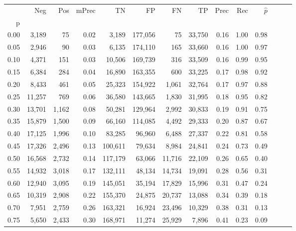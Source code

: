\begin{tabular}{rrrrrrrrrrrrrr}
\toprule
{} &     Neg &    Pos & mPrec &       TN &       FP &      FN &      TP &  Prec &   Rec & $\hat{p}$ \\
p    &         &        &       &          &          &         &         &       &       &           \\
\midrule
0.00 &   3,189 &     75 &  0.02 &    3,189 &  177,056 &      75 &  33,750 &  0.16 &  1.00 &      0.98 \\
0.05 &   2,946 &     90 &  0.03 &    6,135 &  174,110 &     165 &  33,660 &  0.16 &  1.00 &      0.97 \\
0.10 &   4,371 &    151 &  0.03 &   10,506 &  169,739 &     316 &  33,509 &  0.16 &  0.99 &      0.95 \\
0.15 &   6,384 &    284 &  0.04 &   16,890 &  163,355 &     600 &  33,225 &  0.17 &  0.98 &      0.92 \\
0.20 &   8,433 &    461 &  0.05 &   25,323 &  154,922 &   1,061 &  32,764 &  0.17 &  0.97 &      0.88 \\
0.25 &  11,257 &    769 &  0.06 &   36,580 &  143,665 &   1,830 &  31,995 &  0.18 &  0.95 &      0.82 \\
0.30 &  13,701 &  1,162 &  0.08 &   50,281 &  129,964 &   2,992 &  30,833 &  0.19 &  0.91 &      0.75 \\
0.35 &  15,879 &  1,500 &  0.09 &   66,160 &  114,085 &   4,492 &  29,333 &  0.20 &  0.87 &      0.67 \\
0.40 &  17,125 &  1,996 &  0.10 &   83,285 &   96,960 &   6,488 &  27,337 &  0.22 &  0.81 &      0.58 \\
0.45 &  17,326 &  2,496 &  0.13 &  100,611 &   79,634 &   8,984 &  24,841 &  0.24 &  0.73 &      0.49 \\
0.50 &  16,568 &  2,732 &  0.14 &  117,179 &   63,066 &  11,716 &  22,109 &  0.26 &  0.65 &      0.40 \\
0.55 &  14,932 &  3,018 &  0.17 &  132,111 &   48,134 &  14,734 &  19,091 &  0.28 &  0.56 &      0.31 \\
0.60 &  12,940 &  3,095 &  0.19 &  145,051 &   35,194 &  17,829 &  15,996 &  0.31 &  0.47 &      0.24 \\
0.65 &  10,319 &  2,908 &  0.22 &  155,370 &   24,875 &  20,737 &  13,088 &  0.34 &  0.39 &      0.18 \\
0.70 &   7,951 &  2,759 &  0.26 &  163,321 &   16,924 &  23,496 &  10,329 &  0.38 &  0.31 &      0.13 \\
0.75 &   5,650 &  2,433 &  0.30 &  168,971 &   11,274 &  25,929 &   7,896 &  0.41 &  0.23 &      0.09 \\

\end{tabular}
